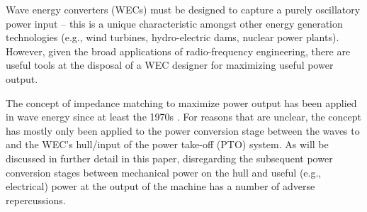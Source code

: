 \documentclass[lettersize,journal]{IEEEtran}
\begin{document}


Wave energy converters (WECs) must be designed to capture a purely oscillatory power input -- this is a unique characteristic amongst other energy generation technologies (e.g., wind turbines, hydro-electric dams, nuclear power plants).
However, given the broad applications of radio-frequency engineering, there are useful tools at the disposal of a WEC designer for maximizing useful power output.

The concept of impedance matching to maximize power output has been applied in wave energy since at least the 1970s \cite{Falnes:1980aa}.
For reasons that are unclear, the concept has mostly only been applied to the power conversion stage between the waves to and the WEC's hull/input of the power take-off (PTO) system.
As will be discussed in further detail in this paper, disregarding the subsequent power conversion stages between mechanical power on the hull and useful (e.g., electrical) power at the output of the machine has a number of adverse repercussions.
\end{document}
